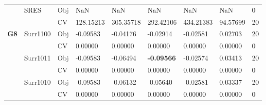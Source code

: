\begin{table*}[!htb]
\begin{tabular}{lllllllll}
		& \multirow{2}{*}{SRES}              & Obj                                & NaN                                & NaN                                & NaN                                  & NaN                                 & NaN                               & 0                \\
		&                                    & CV                                 & 128.15213                          & 305.35718                          & 292.42106                            & 434.21383                           & 94.57699                          & 20               \\ \hline
		\multirow{16}{*}{\textbf{G8}}                & \multirow{2}{*}{Surr1100}          & Obj                                & -0.09583                           & -0.04176                           & -0.02914                             & -0.02581                            & 0.02703                           & 20               \\
		&                                    & CV                                 & 0.00000                            & 0.00000                            & 0.00000                              & 0.00000                             & 0.00000                           & 0                \\
		& \multirow{2}{*}{Surr1011}          & Obj                                & -0.09583                           & -0.06494                           & \textbf{-0.09566}                    & -0.02574                            & 0.03413                           & 20               \\
		&                                    & CV                                 & 0.00000                            & 0.00000                            & 0.00000                              & 0.00000                             & 0.00000                           & 0                \\
		& \multirow{2}{*}{Surr1010}          & Obj                                & -0.09583                           & -0.06132                           & -0.05640                             & -0.02581                            & 0.03337                           & 20               \\
		&                                    & CV                                 & 0.00000                            & 0.00000                            & 0.00000                              & 0.00000                             & 0.00000                           & 0                \\

\end{tabular}
\end{table*}

